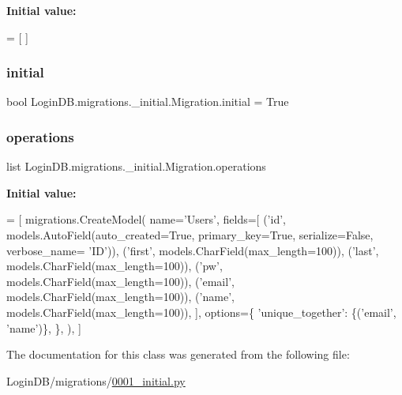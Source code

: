 {\bfseries Initial value\+:}
\begin{DoxyCode}
=  [
    ]
\end{DoxyCode}
\mbox{\label{class_login_d_b_1_1migrations_1_10001__initial_1_1_migration_a781760a44c66be2b67a1307580da0af4}} 
\subsubsection{\texorpdfstring{initial}{initial}}
{\footnotesize\ttfamily bool Login\+D\+B.\+migrations.\+\_\+initial.\+Migration.\+initial = True\hspace{0.3cm}{\ttfamily [static]}}

\mbox{\label{class_login_d_b_1_1migrations_1_10001__initial_1_1_migration_abb908b6518006a1a23e9ee78fa0c3b89}} 
\subsubsection{\texorpdfstring{operations}{operations}}
{\footnotesize\ttfamily list Login\+D\+B.\+migrations.\+\_\+initial.\+Migration.\+operations\hspace{0.3cm}{\ttfamily [static]}}

{\bfseries Initial value\+:}
\begin{DoxyCode}
=  [
        migrations.CreateModel(
            name=\textcolor{stringliteral}{'Users'},
            fields=[
                (\textcolor{stringliteral}{'id'}, models.AutoField(auto\_created=\textcolor{keyword}{True}, primary\_key=\textcolor{keyword}{True}, serialize=\textcolor{keyword}{False}, verbose\_name=\textcolor{stringliteral}{
      'ID'})),
                (\textcolor{stringliteral}{'first'}, models.CharField(max\_length=100)),
                (\textcolor{stringliteral}{'last'}, models.CharField(max\_length=100)),
                (\textcolor{stringliteral}{'pw'}, models.CharField(max\_length=100)),
                (\textcolor{stringliteral}{'email'}, models.CharField(max\_length=100)),
                (\textcolor{stringliteral}{'name'}, models.CharField(max\_length=100)),
            ],
            options=\{
                \textcolor{stringliteral}{'unique\_together'}: \{(\textcolor{stringliteral}{'email'}, \textcolor{stringliteral}{'name'})\},
            \},
        ),
    ]
\end{DoxyCode}


The documentation for this class was generated from the following file\+:\begin{DoxyCompactItemize}
\item 
Login\+D\+B/migrations/\hyperlink{0001__initial_8py}{0001\+\_\+initial.\+py}\end{DoxyCompactItemize}
